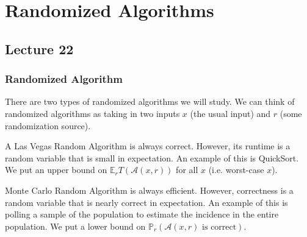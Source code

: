 \section{Randomized Algorithms}
\subsection{Lecture 22}
\subsubsection{Randomized Algorithm}

There are two types of randomized algorithms we will study.
We can think of randomized algorithms as taking in two inputs $x$ (the usual input) and $r$ (some randomization source).

\begin{definition}
    A Las Vegas Random Algorithm is always correct. However, its runtime is a random variable that is small in expectation. An example of this is QuickSort. We put an upper bound on $\mathbb{E}_r{T(\mathcal{A}(x, r))}$ for all $x$ (i.e. worst-case $x$).
\end{definition}

\begin{definition}
    Monte Carlo Random Algorithm is always efficient. However, correctness is a random variable that is nearly correct in expectation. An example of this is polling a sample of the population to estimate the incidence in the entire population. We put a lower bound on $\mathbb{P}_r(\mathcal{A}(x, r) \text{ is correct})$.
\end{definition}


